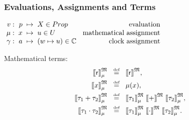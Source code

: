 \documentclass[xcolor=x11names]{beamer}
\newcommand{\defegy}[1][.1]{\hspace{#1cm}\overset{\textup{\tiny def}}{=}\hspace{#1cm}}
\newcommand{\wintension}[3][]{{[}\hspace{-.46mm}{[} {#3}{]}\hspace{-.46mm}{]}^{\mathfrak{#1}}_{#2}}
\newcommand{\intension}[2][]{{[}\hspace{-.46mm}{[} {#2}{]}\hspace{-.46mm}{]}^{\mathfrak{#1}}}
\newenvironment{tomb}[2][.1]{\arraycolsep=#1cm\begin{array}{#2}}{\end{array}}
\begin{document}
\begin{frame}
\frametitle{Evaluations, Assignments and Terms}
\footnotesize

\hfill $\begin{tomb}[0.1]{rrclr}
   v:& p&\mapsto & X \in Prop &\textup{ evaluation}
\\ \mu :& x& \mapsto &u\in U &\textup{ mathematical assignment}
\\ \gamma :& a & \mapsto &(w\mapsto u) \in \mathbb C &\textup{ clock assignment}
\end{tomb}$

\bigskip

Mathematical terms: \[\begin{tomb}[.1]{rcl}
         \wintension[M]{\mu}{\mathsf r} &\defegy & \intension[M]{\mathsf r},
\\[1ex]  \wintension[M]{\mu}{x} &\defegy & \mu(x),
\\[1ex]  \wintension[M]{\mu}{\tau _1+\tau _2}  &\defegy[0]& \wintension[M]{\mu}{\tau_1 } \; \intension[M]{+} \; \wintension[M]{\mu}{\tau_2 },
\\[1ex]  \wintension[M]{\mu}{\tau _1\cdot\tau _2} & \defegy[0] &\wintension[M]{\mu}{\tau _1} \; \intension[M]{\cdot} \; \wintension[M]{\mu}{\tau _2}.
\end{tomb}\]

\end{frame}
\end{document}
